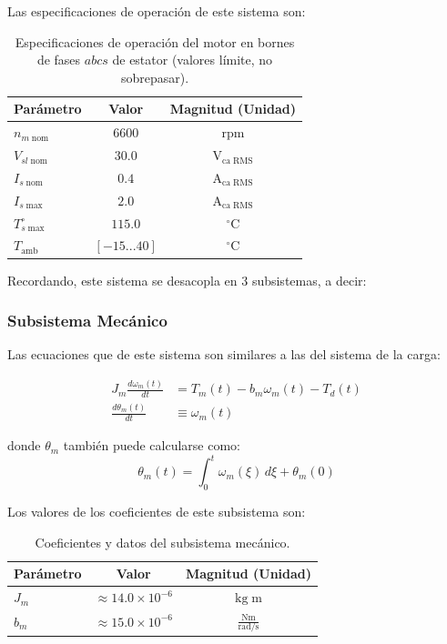 \documentclass[blue,fullpaper]{ludusofficial}  %
\begin{document}
Las especificaciones de operación de este sistema son:

\begin{table}[htbp]
    \centering
    \caption{Especificaciones de operación del motor en bornes de fases $abcs$ de estator (valores límite, no sobrepasar).}
    \label{tab:parametros_carga}
    \begin{tabular}{lcc}
        \hline
        \textbf{Parámetro} & \textbf{Valor} & \textbf{Magnitud (Unidad)} \\
        \hline
        $n_{m \; \mathrm{nom}}$ & $6600$ & $\mathrm{rpm}$ \\
        $V_{sl \; \mathrm{nom}}$ & $30.0$ & $\mathrm{V_{ca \; RMS}}$ \\
        $I_{s \; \mathrm{nom}}$ & $0.4$ & $\mathrm{A_{ca \; RMS}}$ \\
        $I_{s \; \mathrm{max}}$ & $2.0$ & $\mathrm{A_{ca \; RMS}}$ \\
        $T_{s \; \mathrm{max}}^{\circ}$ & $115.0$ & $\mathrm{{}^{\circ}C}$ \\
        $T_{\mathrm{amb}}$ & $[-15 ... 40]$ & $\mathrm{{}^{\circ}C}$ \\
        \hline
    \end{tabular}
\end{table}

Recordando, este sistema se desacopla en 3 subsistemas, a decir:




\subsubsection{Subsistema Mecánico}
Las ecuaciones que de este sistema son similares a las del sistema de la carga:

\begin{align}
    J_m \frac{d\omega_m(t)}{dt} &= T_m(t) - b_m \omega_m(t) - T_d(t) \label{SubMec1}\\
    \frac{d\theta_m(t)}{dt} &\equiv \omega_m(t)  \label{SubMec2}
\end{align}

donde $\theta_m$ también puede calcularse como:
\[
\theta_{m}(t) = \int_{0}^{t} \omega_{m}(\xi) \, d\xi + \theta_{m}(0) 
\]

Los valores de los coeficientes de este subsistema son:
\begin{table}[htbp]
    \centering
    \caption{Coeficientes y datos del subsistema mecánico.}
    \label{tab:parametros_carga}
    \begin{tabular}{lcc}
        \hline
        \textbf{Parámetro} & \textbf{Valor} & \textbf{Magnitud (Unidad)} \\
        \hline
        $J_m$ & $\approx 14.0 \times 10^{-6}$ & $\mathrm{\mathrm{kg \; m}}$ \\
        $b_m$ & $\approx 15.0 \times 10^{-6}$ & $\mathrm{\mathrm{\frac{Nm}{rad/s}}}$ \\
        \hline
    \end{tabular}
\end{table}
\end{document}

